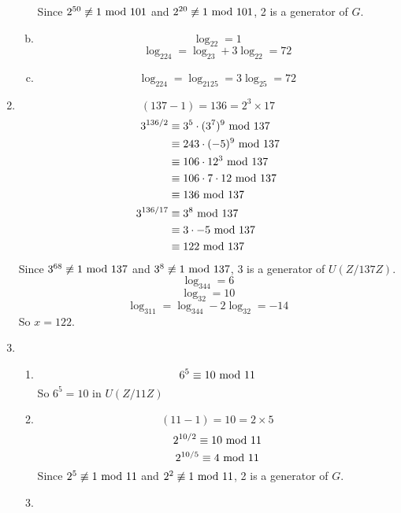 \documentclass{article}
\renewcommand{\mod}{{\rm\ mod\ }}
\begin{document}
\begin{enumerate}
\begin{enumerate}[(a)]
Since $2^{50}\not\equiv1\mod101$ and $2^{20}\not\equiv1\mod101$, 2 is a generator of $G$.
\item
$$\log_22=1$$
$$\log_224=\log_23+3\log_22=72$$
\item
$$\log_224=\log_2125=3\log_25=72$$
\end{enumerate}

\item
$$(137-1)=136=2^3\times17$$
\begin{align*}
3^{136/2}&\equiv3^5\cdot(3^{7})^9\mod 137\\
&\equiv243\cdot(-5)^9\mod 137\\
&\equiv106\cdot12^3\mod 137\\
&\equiv106\cdot7\cdot12\mod 137\\
&\equiv136\mod 137\\
3^{136/17}&\equiv3^8\mod 137\\
&\equiv3\cdot-5\mod 137\\
&\equiv122\mod 137
\end{align*}
Since $3^{68}\not\equiv1\mod 137$ and $3^{8}\not\equiv1\mod 137$, 3 is a generator of $U(Z/137Z)$.\\
$$\log_344=6$$
$$\log_32=10$$
$$\log_311=\log_344-2\log_32=-14$$
So $x=122$.
\item
\begin{enumerate}
\item
$$6^5\equiv10\mod11$$
So $6^5=10$ in $U(Z/11Z)$
\item
$$(11-1)=10=2\times5$$
$$2^{10/2}\equiv10\mod 11$$
$$2^{10/5}\equiv4\mod 11$$
Since $2^{5}\not\equiv1\mod11$ and $2^{2}\not\equiv1\mod11$, 2 is a generator of $G$.
\item

\end{enumerate}
\end{enumerate}
\end{document}
